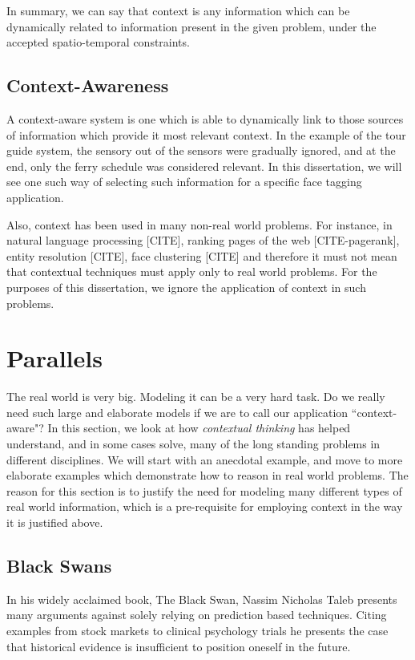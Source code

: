 In summary, we can say that context is any information which can be dynamically related to information present in the given problem, under the accepted spatio-temporal constraints.

\subsection{Context-Awareness}
A context-aware system is one which is able to dynamically link to those sources of information which provide it most relevant context. In the example of the tour guide system, the sensory out of the sensors were gradually ignored, and at the end, only the ferry schedule was considered relevant. In this dissertation, we will see one such way of selecting such information for a specific face tagging application. 

Also, context has been used in many non-real world problems. For instance, in natural language processing [CITE], ranking pages of the web [CITE-pagerank], entity resolution [CITE], face clustering [CITE] and therefore it must not mean that contextual techniques must apply only to real world problems. For the purposes of this dissertation, we ignore the application of context in such problems.

\section{Parallels}
The real world is very big. Modeling it can be a very hard task. Do we really need such large and elaborate models if we are to call our application ``context-aware"? In this section, we look at how \textit{contextual thinking} has helped understand, and in some cases solve, many of the long standing problems in different disciplines. We will start with an anecdotal example, and move to more elaborate examples which demonstrate how to reason in real world problems. The reason for this section is to justify the need for modeling many different types of real world information, which is a pre-requisite for employing context in the way it is justified above. 

\subsection{Black Swans}
In his widely acclaimed book, The Black Swan, Nassim Nicholas Taleb presents many arguments against solely relying on prediction based techniques. Citing examples from stock markets to clinical psychology trials he presents the case that historical evidence is insufficient to position oneself in the future. 

